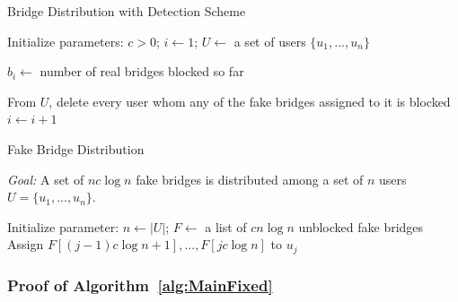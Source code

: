 \begin{algorithm}[H]
	\caption{Bridge Distribution with Detection Scheme}
	\label{alg:MainFixed}
	
	\vspace{2pt}
	\algFont \vspace{5pt}
	\begin{algorithmic}[1]
		\State Initialize parameters: $c > 0$; $i \gets 1$; $U \gets$ a set of users $\{u_1,...,u_{n}\}$
		\State {} %
		\State {} %
		
		\While{\True}
			\State $b_i \gets$ number of real bridges blocked so far %
			
			\State From $U$, delete every user whom any of the fake 
			\Statex \hspace{\algorithmicindent}bridges assigned to it is blocked
			 \label{ln:ConditionFixed}
				\State $i \gets i+1$ \label{ln:IncrementFixed}  %
				\State {} \label{ln:DistributeFixed} %
				\State {} %
			\EndIf
		\EndWhile
	\end{algorithmic}
\end{algorithm}

\begin{algorithm}
	\caption{Fake Bridge Distribution}
	\label{alg:DistFakes}
	
	\algFont \vspace{5pt}
	\textit{Goal:} A set of $nc\log{n}$ fake bridges is distributed among a set of $n$ users $U = \{u_1,...,u_n\}$.
	\begin{algorithmic}[1]
			\State Initialize parameter: $n \gets |U|$; $F \gets$ a list of 
			\Statex \hspace{\algorithmicindent}$cn\log{n}$ unblocked fake bridges
				\State Assign $F[(j-1)c\log{n} + 1],...,F[jc\log{n}]$ to $u_j$
			\EndFor
		\EndFunction
	\end{algorithmic}
\end{algorithm}

\subsubsection{Proof of Algorithm~\ref{alg:MainFixed}} \label{sec:ProofFixed}

